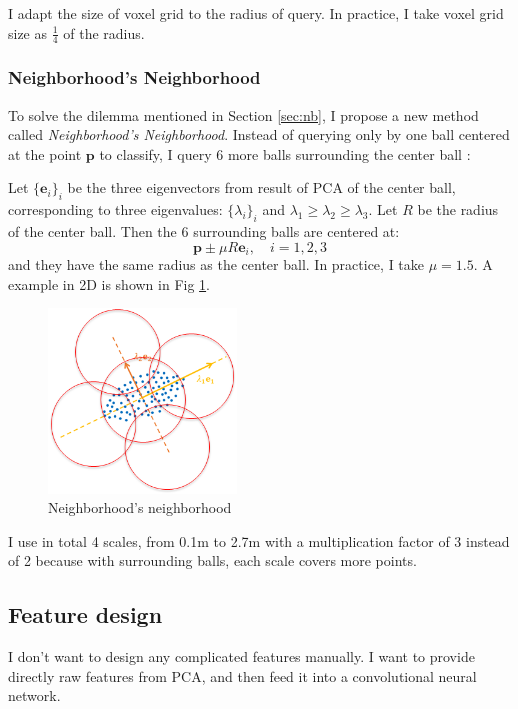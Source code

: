 \documentclass{article}
\begin{document}
I adapt the size of voxel grid to the radius of query. In practice, I take voxel grid size as $\frac{1}{4}$ of the radius.

\subsubsection{Neighborhood's Neighborhood}
To solve the dilemma mentioned in Section \ref{sec:nb}, I propose a new method called \textit{Neighborhood's Neighborhood}. Instead of querying only by one ball centered at the point $\mathbf{p}$ to classify, I query 6 more balls surrounding the center ball : 

Let $\{\mathbf{e}_i\}_{i}$ be the three eigenvectors from result of PCA of the center ball, corresponding to three eigenvalues: $\{\lambda_i\}_{i}$ and $\lambda_1 \geq \lambda_2 \geq \lambda_3$. Let $R$ be the radius of the center ball. Then the 6 surrounding balls are centered at:
\begin{equation}
\mathbf{p}\pm \mu R \mathbf{e}_i,\quad i=1,2,3
\end{equation}
and they have the same radius as the center ball. In practice, I take $\mu=1.5$. A example in 2D is shown in Fig \ref{fig:nbnb}.

\begin{figure}[h]
	\centering
	\includegraphics[width=5cm]{nbnb.png}
	\caption{Neighborhood's neighborhood}
	\label{fig:nbnb}
\end{figure}

I use in total 4 scales, from 0.1m to 2.7m with a multiplication factor of 3 instead of 2 because with surrounding balls, each scale covers more points.

\subsection{Feature design}
I don't want to design any complicated features manually. I want to provide directly raw features from PCA, and then feed it into a convolutional neural network.
\end{document}
